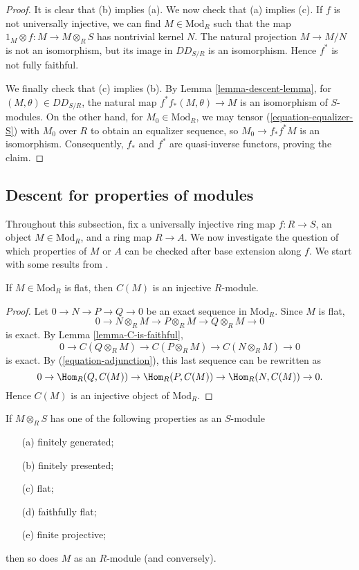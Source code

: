 \begin{proof}
It is clear that (b) implies (a). We now check that (a) implies (c). If $f$ is 
not universally injective, we can find $M \in \text{Mod}_R$ such that the map
$1_M \otimes f: M \to M \otimes_R S$ has nontrivial kernel $N$.
The natural projection $M \to M/N$ is not an isomorphism, but its image in 
$DD_{S/R}$ is an isomorphism.
Hence $f^*$ is not fully faithful.

\medskip\noindent
We finally check that (c) implies (b). By Lemma \ref{lemma-descent-lemma}, for
$(M, \theta) \in DD_{S/R}$,
the natural map $f^* f_*(M,\theta) \to M$ is an isomorphism of $S$-modules. On 
the other hand, for $M_0 \in \text{Mod}_R$,
we may tensor (\ref{equation-equalizer-S}) with $M_0$ over $R$ to obtain an 
equalizer sequence,
so $M_0 \to f_* f^* M$ is an isomorphism. Consequently, $f_*$ and $f^*$ are 
quasi-inverse functors, proving the claim.
\end{proof}

\subsection{Descent for properties of modules}
\label{subsection-descent-properties-modules}

\noindent
Throughout this subsection, fix a universally injective ring map $f : R \to S$,
an object $M \in \text{Mod}_R$, and a ring map $R \to A$. We now investigate
the question of which properties of $M$ or $A$ can be checked after base
extension along $f$. We start with some results from 
\cite{mesablishvili2}.

\begin{lemma}
\label{lemma-flat-to-injective}
If $M \in \text{Mod}_R$ is flat, then $C(M)$ is an injective $R$-module.
\end{lemma}

\begin{proof}
Let $0 \to N \to P \to Q \to 0$ be an exact sequence in $\text{Mod}_R$. Since 
$M$ is flat,
$$
0 \to N \otimes_R M \to P \otimes_R M \to Q \otimes_R M \to 0
$$
is exact.
By Lemma \ref{lemma-C-is-faithful},
$$
0 \to C(Q \otimes_R M) \to C(P \otimes_R M) \to C(N \otimes_R M) \to 0
$$
is exact. By (\ref{equation-adjunction}), this last sequence can be rewritten
as
$$
0 \to \Hom_R(Q, C(M)) \to \Hom_R(P, C(M)) \to \Hom_R(N, C(M)) \to 0.
$$
Hence $C(M)$ is an injective object of $\text{Mod}_R$.
\end{proof}

\begin{theorem}
\label{theorem-descend-module-properties}
If $M \otimes_R S$ has one of the following properties as an $S$-module
\begin{enumerate}
\item[(a)]
finitely generated;
\item[(b)]
finitely presented;
\item[(c)]
flat;
\item[(d)]
faithfully flat;
\item[(e)]
finite projective;
\end{enumerate}
then so does $M$ as an $R$-module (and conversely).
\end{theorem}

